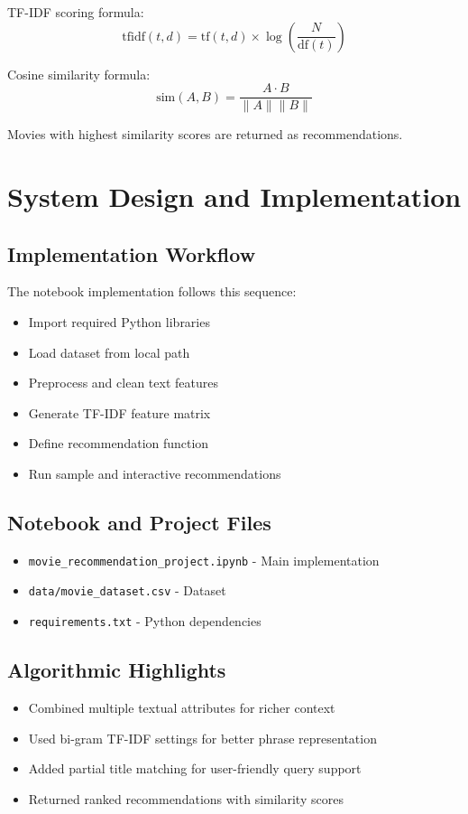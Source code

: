 \documentclass[12pt,a4paper]{report}
\begin{document}
TF-IDF scoring formula:
\[
\mathrm{tfidf}(t,d) = \mathrm{tf}(t,d) \times \log\left(\frac{N}{\mathrm{df}(t)}\right)
\]

Cosine similarity formula:
\[
\mathrm{sim}(A,B) = \frac{A \cdot B}{\|A\|\|B\|}
\]

Movies with highest similarity scores are returned as recommendations.

\chapter{System Design and Implementation}

\section{Implementation Workflow}
The notebook implementation follows this sequence:
\begin{itemize}[leftmargin=1.2cm]
\item Import required Python libraries
\item Load dataset from local path
\item Preprocess and clean text features
\item Generate TF-IDF feature matrix
\item Define recommendation function
\item Run sample and interactive recommendations
\end{itemize}

\section{Notebook and Project Files}
\begin{itemize}[leftmargin=1.2cm]
\item \texttt{movie\_recommendation\_project.ipynb} - Main implementation
\item \texttt{data/movie\_dataset.csv} - Dataset
\item \texttt{requirements.txt} - Python dependencies
\end{itemize}

\section{Algorithmic Highlights}
\begin{itemize}[leftmargin=1.2cm]
\item Combined multiple textual attributes for richer context
\item Used bi-gram TF-IDF settings for better phrase representation
\item Added partial title matching for user-friendly query support
\item Returned ranked recommendations with similarity scores
\end{itemize}
\end{document}
